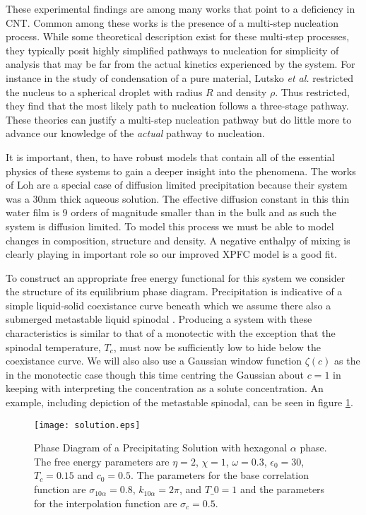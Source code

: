 These experimental findings are among many works that point to a deficiency in
CNT. Common among these works is the presence of a multi-step nucleation
process. While some theoretical description exist for these multi-step
processes, they typically posit highly simplified pathways to nucleation for
simplicity of analysis that may be far from the actual kinetics experienced by
the system.  For instance in the study of condensation of a pure material,
Lutsko \textit{et al.} \cite{LUTSKO15} restricted the nucleus to a spherical
droplet with radius $R$ and density $\rho$. Thus restricted, they find that the
most likely path to nucleation follows a three-stage pathway.  These theories
can justify a multi-step nucleation pathway but do little more to advance our
knowledge of the \textit{actual} pathway to nucleation.

It is important, then, to have robust models that contain all of the essential
physics of these systems to gain a deeper insight into the phenomena. The works
of Loh \cite{LOH17} are a special case of diffusion limited precipitation because
their system was a 30nm thick aqueous solution. The effective diffusion
constant in this thin water film is 9 orders of magnitude smaller than in the
bulk and as such the system is diffusion limited. To model this process we must
be able to  model changes in composition, structure and density. A negative
enthalpy of mixing is clearly playing in important role so our improved XPFC
model is a good fit.

To construct an appropriate free energy functional for this system we consider
the structure of its equilibrium phase diagram. Precipitation is indicative of
a simple liquid-solid coexistance curve beneath which we assume there also a
submerged metastable liquid spinodal \cite{DAVEY13}. Producing a system with
these characteristics is similar to that of a monotectic with the exception
that the spinodal temperature, $T_c$, must now be sufficiently low to hide
below the coexistance curve. We will also also use a Gaussian window function
$\zeta(c)$ as the in the monotectic case though this time centring the Gaussian
about $c = 1$ in keeping with interpreting the concentration as a solute
concentration.  An example, including depiction of the metastable spinodal, can
be seen in figure \ref{fig:precip_phase_dia}.

\begin{figure}
    \centering	
    \texttt{[image: solution.eps]}
    \caption[Coexistance Phase Diagram with Metastable Spinodal]{
        \label{fig:precip_phase_dia} Phase Diagram of a Precipitating Solution
        with hexagonal $\alpha$ phase. The free energy parameters are $\eta =
        2$, $\chi = 1$, $\omega=0.3$, $\epsilon_0=30$, $T_c = 0.15$ and
        $c_0=0.5$. The parameters for the base correlation function are
        $\sigma_{10\alpha} = 0.8$, $k_{10\alpha} = 2\pi$, and $T\_0 = 1$ and
        the parameters for the interpolation function are $\sigma_c = 0.5$.
    }
\end{figure}


